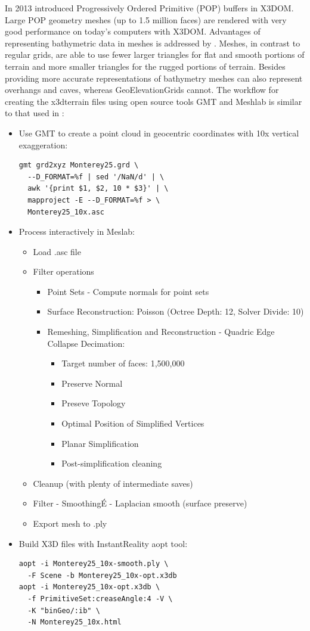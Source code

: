 \documentclass[conference]{IEEEtran}
\begin{document}
In 2013 \cite{Limper:2013:FDW:2466533.2466536} introduced Progressively Ordered Primitive (POP) buffers in X3DOM. Large POP geometry meshes (up to 1.5 million faces) are rendered with very good performance on today's computers with X3DOM. Advantages of representing bathymetric data in meshes is addressed by \cite{Becker:2005:NPN:1650409.1650513}. Meshes, in contrast to regular grids, are able to use fewer larger triangles for flat and smooth portions of terrain and more smaller triangles for the rugged portions of terrain. Besides providing more accurate representations of bathymetry meshes can also represent overhangs and caves, whereas GeoElevationGrids cannot. The workflow for creating the x3dterrain files using open source tools GMT \cite{GMT} and Meshlab \cite{Meshlab} is similar to that used in \cite{Silvestre}:

\begin{itemize}
\item Use GMT to create a point cloud in geocentric coordinates with 10x vertical exaggeration:
\begin{verbatim}
gmt grd2xyz Monterey25.grd \
  --D_FORMAT=%f | sed '/NaN/d' | \
  awk '{print $1, $2, 10 * $3}' | \ 
  mapproject -E --D_FORMAT=%f > \
  Monterey25_10x.asc
\end{verbatim}
\item Process interactively in Meslab:
\begin{itemize}
\item Load .asc file
\item Filter operations
\begin{itemize}
\item Point Sets - Compute normals for point sets
\item Surface Reconstruction: Poisson (Octree Depth: 12, Solver Divide: 10)
\item Remeshing, Simplification and Reconstruction - Quadric Edge Collapse Decimation:
\begin{itemize}
\item Target number of faces: 1,500,000
\item Preserve Normal
\item Preseve Topology
\item Optimal Position of Simplified Vertices
\item Planar Simplification
\item Post-simplification cleaning
\end{itemize}
\end{itemize}
\item Cleanup (with plenty of intermediate saves)
\item Filter - SmoothingÉ - Laplacian smooth (surface preserve)
\item Export mesh to .ply
\end{itemize}
\item Build X3D files with InstantReality aopt tool:
\begin{verbatim}
aopt -i Monterey25_10x-smooth.ply \
  -F Scene -b Monterey25_10x-opt.x3db
aopt -i Monterey25_10x-opt.x3db \
  -f PrimitiveSet:creaseAngle:4 -V \
  -K "binGeo/:ib" \
  -N Monterey25_10x.html
\end{verbatim}
\end{itemize}
\end{document}
